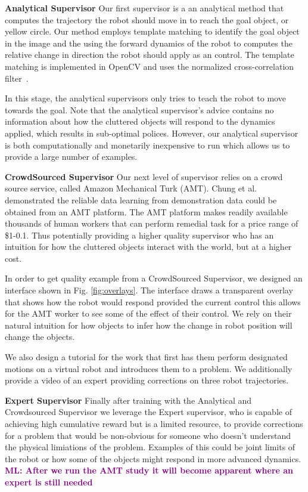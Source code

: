 \documentclass[10pt, conference]{ieeeconf}      %
\newcommand{\mlnote}[1]{\ifthenelse{ \boolean{include-notes}}%
 {\textcolor{purple}{\textbf{ML: #1}}}{}}
\begin{document}
\noindent \textbf{Analytical Supervisor} Our first supervisor is a an analytical method that computes the trajectory the robot should move in to reach the goal object, or yellow circle. Our method employs template matching to identify the goal object in the image and the using the forward dynamics of the robot to computes the relative change in direction the robot should apply as an control. The template matching is implemented in OpenCV and uses the normalized cross-correlation filter~\cite{opencv_library}.

In this stage, the analytical supervisors only tries to teach the robot to move towards the goal. Note that the analytical supervisor's advice contains no information about how the cluttered objects will respond to the dynamics applied, which results in sub-optimal polices. However, our analytical supervisor is both computationally and monetarily inexpensive to run which allows us to provide a large number of examples. 


\noindent \textbf{CrowdSourced Supervisor} Our next level of supervisor relies on a crowd source service, called Amazon Mechanical Turk (AMT). Chung et al. demonstrated the reliable data learning from demonstration data could be obtained from an AMT platform. The AMT platform makes readily available thousands of human workers that can perform remedial task for a price range of \$1-0.1\cite{chung2014accelerating}. Thus potentially providing a higher quality supervisor who has an intuition for how the cluttered objects interact with the world, but at a higher cost. 

In order to get quality example from a CrowdSourced Supervisor, we designed an interface shown in Fig. \ref{fig:overlays}. The interface draws a transparent overlay that shows how the robot would respond provided the current control this allows for the AMT worker to see some of the effect of their control. We rely on their natural intuition for how objects to infer how the change in robot position will change the objects.

We also design a tutorial for the work that first has them perform designated motions on a virtual robot and introduces them to a problem. We additionally provide a video of an expert providing corrections on three robot trajectories. 



\noindent \textbf{Expert Supervisor} Finally after training with the Analytical and Crowdsourced Supervisor we leverage the Expert supervisor, who is capable of achieving high cumulative reward but is a limited resource, to provide corrections for a problem that would be non-obvious for someone who doesn't understand the physical limiations of the problem. Examples of this could be joint limits of the robot or how some of the objects might respond in more advanced dynamics. \mlnote{After we run the AMT study it will become apparent where an expert is still needed}
\end{document}
